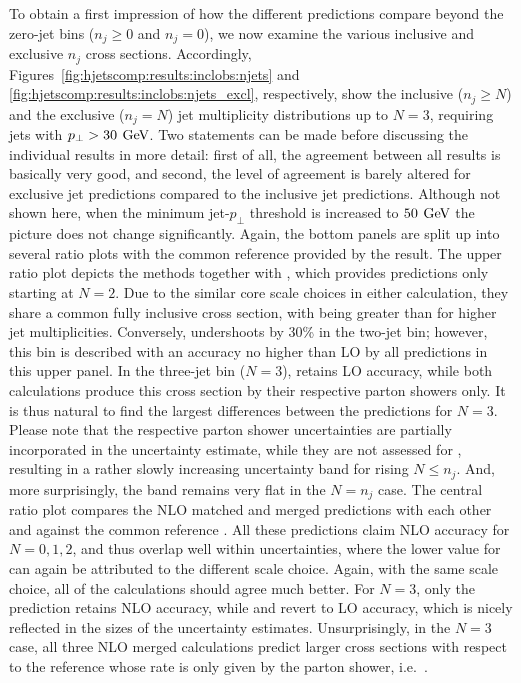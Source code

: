 To obtain a first impression of how the different predictions 
compare beyond the zero-jet bins ($n_j\ge0$ and $n_j=0$), we now
examine the various inclusive and exclusive $n_j$ cross sections.
Accordingly, Figures~\ref{fig:hjetscomp:results:inclobs:njets} and
\ref{fig:hjetscomp:results:inclobs:njets_excl}, respectively, show the
inclusive ($n_j\ge N$) and the exclusive ($n_j=N$) jet multiplicity
distributions up to $N=3$, requiring \hjetscompantikt jets
with $p_\perp>30\,\text{\:GeV}$. Two statements can be made before discussing
the individual results in more detail:
first of all, the agreement between all results is basically very good, and
second, the level of agreement is barely altered for exclusive jet
predictions compared to the inclusive jet predictions. 
Although not
shown here, when  the minimum jet-$p_\perp$ threshold is increased to
$50\,\text{\:GeV}$ the picture does not change significantly.
Again, the bottom panels are split up into several ratio plots with
the common reference provided by the \hjetscompPowheg \hjetscompNNLOPS result. The
upper ratio plot depicts the \hjetscompNNLOPS methods together
with \hjetscompHej, which provides predictions only starting at $N=2$. Due to the similar core scale
choices in either \hjetscompNNLOPS calculation, they share a common fully
inclusive cross section, with \hjetscompSherpa being greater than \hjetscompPowheg for higher
jet multiplicities. Conversely, \hjetscompHej undershoots by 30\% in the
two-jet bin; however, this bin is described with an accuracy no higher
than LO by all predictions in this upper panel. In the three-jet bin
($N=3$), \hjetscompHej retains  LO accuracy, while both \hjetscompNNLOPS calculations
produce this cross section by their respective parton showers
only. It is thus natural to find the largest differences between the
\hjetscompNNLOPS predictions for $N=3$. Please note that the respective parton
shower uncertainties are partially incorporated in the \hjetscompSherpa \hjetscompNNLOPS
uncertainty estimate, while they are not assessed for \hjetscompPowheg,
resulting in a rather slowly increasing uncertainty band for rising
$N\le n_j$. And, more surprisingly, the \hjetscompPowheg band remains very flat
in the $N=n_j$ case. The central ratio plot
compares the NLO matched and merged predictions with each other and
against the common reference \hjetscompPowheg \hjetscompNNLOPS. All these predictions
claim NLO accuracy for $N=0,1,2$, and thus overlap well within
uncertainties, where the lower value for \hjetscompMGaMC can again be attributed
to the different scale choice. Again, with the same scale choice, all of
the calculations should agree much better. For $N=3$, only the \hjetscompSherpa \hjetscompMEPSatNLO
prediction retains NLO accuracy, while \hjetscompMGaMC and \hjetscompHerwig revert to LO
accuracy, which is nicely reflected in the sizes of the uncertainty estimates. 
Unsurprisingly, in the $N=3$ case, all three NLO merged calculations
predict larger cross sections with respect to the reference whose rate
is only given by the parton shower, i.e.~\hjetscompPythia.

